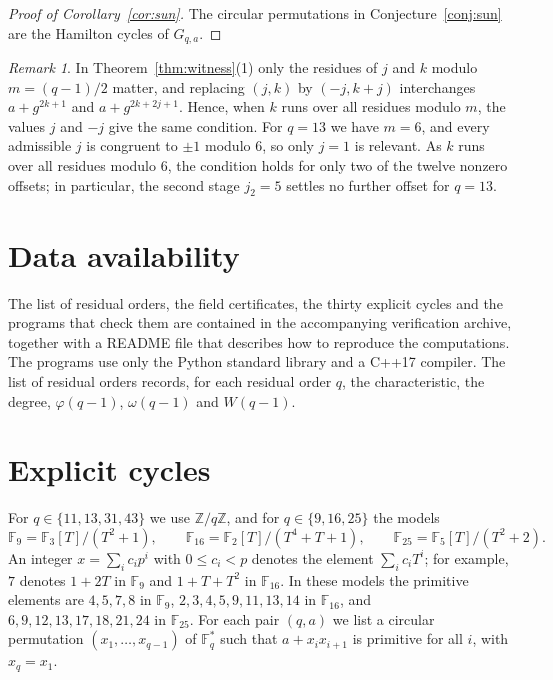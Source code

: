 \documentclass{amsart}
\theoremstyle{remark}
\newtheorem{remark}[theorem]{Remark}
\numberwithin{equation}{section}
\numberwithin{table}{section}
\newcommand{\F}{\mathbb{F}}
\begin{document}
\begin{proof}[Proof of Corollary~\ref{cor:sun}]
The circular permutations in Conjecture~\ref{conj:sun} are the Hamilton cycles of $G_{q,a}$.
\end{proof}

\begin{remark}
In Theorem~\ref{thm:witness}(1) only the residues of $j$ and $k$ modulo $m=(q-1)/2$ matter, and replacing $(j,k)$ by $(-j,k+j)$ interchanges $a+g^{2k+1}$ and $a+g^{2k+2j+1}$. Hence, when $k$ runs over all residues modulo $m$, the values $j$ and $-j$ give the same condition. For $q=13$ we have $m=6$, and every admissible $j$ is congruent to $\pm1$ modulo $6$, so only $j=1$ is relevant. As $k$ runs over all residues modulo $6$, the condition holds for only two of the twelve nonzero offsets; in particular, the second stage $j_2=5$ settles no further offset for $q=13$.
\end{remark}

\appendix

\section{Data availability}\label{app:data}

The list of residual orders, the field certificates, the thirty explicit cycles and the programs that check them are contained in the accompanying verification archive, together with a README file that describes how to reproduce the computations. The programs use only the Python standard library and a C++17 compiler. The list of residual orders records, for each residual order $q$, the characteristic, the degree, $\varphi(q-1)$, $\omega(q-1)$ and $W(q-1)$.

\section{Explicit cycles}\label{app:cycles}

For $q\in\{11,13,31,43\}$ we use $\mathbb Z/q\mathbb Z$, and for $q\in\{9,16,25\}$ the models
\[
\F_9=\F_3[T]/(T^{2}+1),\qquad \F_{16}=\F_2[T]/(T^{4}+T+1),\qquad \F_{25}=\F_5[T]/(T^{2}+2).
\]
An integer $x=\sum_ic_ip^{i}$ with $0\le c_i<p$ denotes the element $\sum_ic_iT^{i}$; for example, $7$ denotes $1+2T$ in $\F_9$ and $1+T+T^{2}$ in $\F_{16}$. In these models the primitive elements are $4,5,7,8$ in $\F_9$, $2,3,4,5,9,11,13,14$ in $\F_{16}$, and $6,9,12,13,17,18,21,24$ in $\F_{25}$. For each pair $(q,a)$ we list a circular permutation $(x_1,\dots,x_{q-1})$ of $\F_q^{*}$ such that $a+x_ix_{i+1}$ is primitive for all $i$, with $x_q=x_1$.
\end{document}
